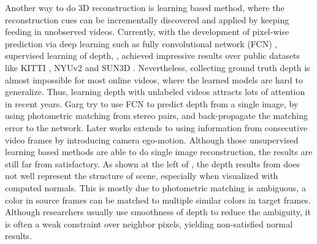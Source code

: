 Another way to do 3D reconstruction is learning based method, where the reconstruction cues can be incrementally discovered and applied by keeping feeding in unobserved videos. Currently, with the development of pixel-wise prediction via deep learning such as fully convolutional network (FCN) \cite{long2015fully}, supervised learning of depth, \eg \cite{eigen2014depth,ummenhofer2016demon}, achieved impressive results over public datasets like KITTI \cite{geiger2012we}, NYUv2 \cite{silberman2012indoor} and SUN3D \cite{xiao2013sun3d}. 
Nevertheless, collecting ground truth depth is almost impossible for most online videos, where the learned models are hard to generalize. 
Thus, learning depth with unlabeled videos attracts lots of attention in recent years.
Garg \etal \cite{godard2016unsupervised} try to use FCN to predict depth from a single image, by using photometric matching from stereo pairs, and back-propagate the matching error to the network. Later works \cite{zhou2017unsupervised,Vijayanarasimhan17} extends to using information from consecutive video frames by introducing camera ego-motion. 
Although those unsupervised learning based methods are able to do single image reconstruction, the results are still far from satisfactory. As shown at the left of , the depth results from \cite{zhou2017unsupervised} does not well represent the structure of scene, especially when visualized with computed normals. 
This is mostly due to photometric matching is ambiguous, \ie a color in source frames can be matched to multiple similar colors in target frames. Although researchers usually use smoothness of depth \cite{zhou2017unsupervised} to reduce the ambiguity, it is often a weak constraint over neighbor pixels, yielding non-satisfied normal results.

